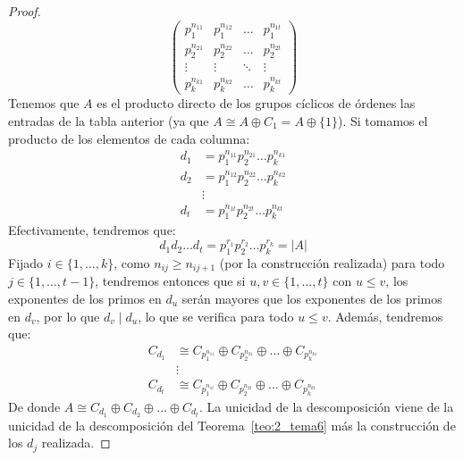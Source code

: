 \begin{teo}
\begin{proof}
        \begin{equation*}
            \left(\begin{array}{cccc}
                p_1^{n_{11}} & p_1^{n_{12}} & \ldots & p_1^{n_{1t}} \\
                p_2^{n_{21}} & p_2^{n_{22}} & \ldots  & p_2^{n_{2t}}  \\
                 \vdots & \vdots & \ddots & \vdots \\
                 p_k^{n_{k1}} & p_k^{n_{k2}} & \ldots & p_k^{n_{kt}}  
            \end{array}\right)
        \end{equation*}
        Tenemos que $A$ es el producto directo de los grupos cíclicos de órdenes las entradas de la tabla anterior (ya que $A \cong A \oplus C_1 = A\oplus \{1\}$). Si tomamos el producto de los elementos de cada columna:
        \begin{align*}
            d_1 &= p_1^{n_{11}}p_2^{n_{21}} \ldots p_k^{n_{k1}} \\
            d_2 &= p_1^{n_{12}}p_2^{n_{22}} \ldots p_k^{n_{k2}} \\
                &\vdots \\
            d_t &= p_1^{n_{1t}}p_2^{n_{2t}} \ldots p_k^{n_{kt}} 
        \end{align*}
        Efectivamente, tendremos que:
        \begin{equation*}
            d_1d_2 \ldots d_t = p_1^{r_1} p_2^{r_2} \ldots p_k^{r_k} = |A|
        \end{equation*}
        Fijado $i \in \{1,\ldots,k\}$, como $n_{ij}\geq n_{ij+1}$ (por la construcción realizada) para todo $j \in \{1,\ldots,t-1\}$, tendremos entonces que si $u,v\in \{1,\ldots,t\}$ con $u\leq v$, los exponentes de los primos en $d_u$ serán mayores que los exponentes de los primos en $d_v$, por lo que $d_v \mid d_u$, lo que se verifica para todo $u\leq v$. Además, tendremos que:
        \begin{align*}
            C_{d_1} &\cong C_{p_1^{n_{11}}} \oplus C_{p_2^{n_{21}}} \oplus \ldots \oplus C_{p_k^{n_{k1}}} \\
                    &\vdots \\
            C_{d_t} &\cong C_{p_1^{n_{1t}}} \oplus C_{p_2^{n_{2t}}} \oplus \ldots \oplus C_{p_k^{n_{kt}}} 
        \end{align*}
        De donde $A \cong C_{d_1}\oplus C_{d_2}\oplus \ldots \oplus C_{d_t}$. La unicidad de la descomposición viene de la unicidad de la descomposición del Teorema~\ref{teo:2_tema6} más la construcción de los $d_j$ realizada.
    \end{proof} 
\end{teo}

